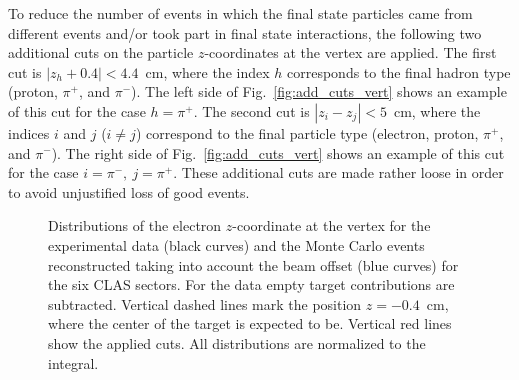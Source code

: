 To reduce the number of events in which the final state particles came from different events and/or took part in final state interactions, the following two additional cuts on the particle $z$-coordinates at the vertex are applied. The first cut is $|z_{h} + 0.4| < 4.4$~cm, where the index $h$ corresponds to the final hadron type (proton, $\pi^{+}$, and $\pi^{-}$). The left side of Fig.~\ref{fig:add_cuts_vert} shows an example of this cut for the case $h=\pi^{+}$. The second cut is $|z_{i} - z_{j}| < 5$~cm, where the indices $i$ and $j$ ($i\neq j$) correspond to the final particle type (electron, proton, $\pi^{+}$, and $\pi^{-}$). The right side of Fig.~\ref{fig:add_cuts_vert} shows an example of this cut for the case $i=\pi^{-},~j=\pi^{+}$. These additional cuts are made rather loose in order to avoid unjustified loss of good events.

\begin{figure}[!ht]
\begin{center}
\end{center}
\caption{\small Distributions of the electron $z$-coordinate at the vertex for the experimental data (black curves) and the Monte Carlo events reconstructed taking into account the beam offset (blue curves) for the six CLAS sectors. For the data empty target contributions are subtracted. Vertical dashed lines mark the position $z = -0.4$~cm, where the center of the target is expected to be. Vertical red lines show the applied cuts. All distributions are normalized to the integral. }
\label{fig:z_el_data_sim}
\end{figure}

